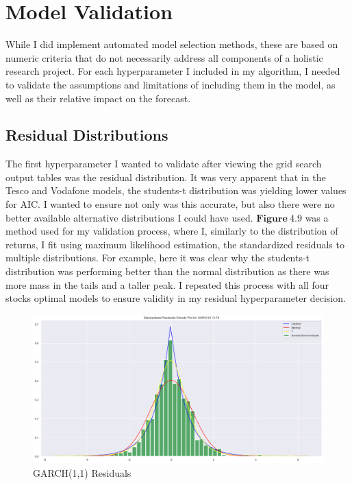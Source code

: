 \section{Model Validation}
While I did implement automated model selection methods, these are based on numeric criteria that do not necessarily address all components of a holistic research project. For each hyperparameter I included in my algorithm, I needed to validate the assumptions and limitations of including them in the model, as well as their relative impact on the forecast. 

\subsection{Residual Distributions}
The first hyperparameter I wanted to validate after viewing the grid search output tables was the residual distribution. It was very apparent that in the Tesco and Vodafone models, the students-t distribution was yielding lower values for AIC. I wanted to ensure not only was this accurate, but also there were no better available alternative distributions I could have used. $\mathbf{Figure~4.9}$ was a method used for my validation process, where I, similarly to the distribution of returns, I fit using maximum likelihood estimation, the standardized residuals to multiple distributions. For example, here it was clear why the students-t distribution was performing better than the normal distribution as there was more mass in the tails and a taller peak. I repeated this process with all four stocks optimal models to ensure validity in my residual hyperparameter decision.
\begin{figure}[H]
\centering
\includegraphics[scale = 0.35]{images/GarchResiduals.png}
\caption{GARCH(1,1) Residuals}
\label{fig: Garch Residuals}
\end{figure}

